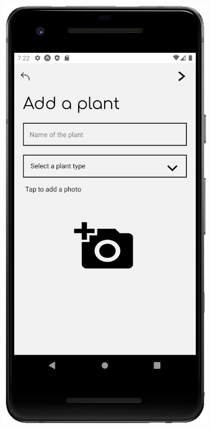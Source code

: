 \documentclass[10pt]{article}
\begin{document}
    \clearpage
    \begin{figure}[h]
     \centering
     \begin{minipage}[h]{0.4\textwidth}
         \centering
         \includegraphics[width=\textwidth]{resources/screens/AddPlant1.PNG}

\end{minipage}
\end{figure}
\end{document}
